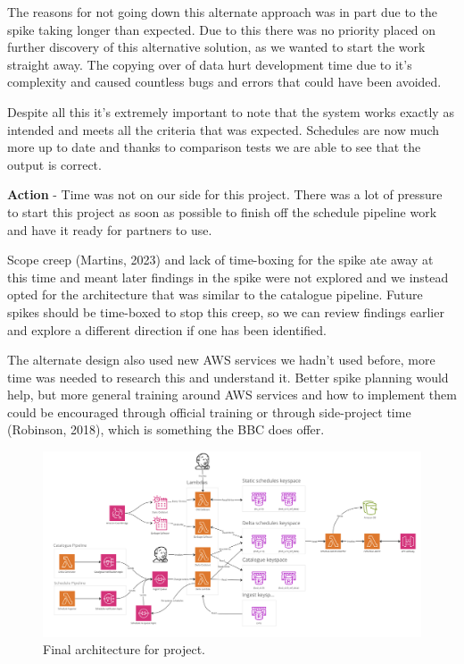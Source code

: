   The reasons for not going down this alternate approach was in part due to the spike taking longer than expected. Due to this there was no priority placed 
  on further discovery of this alternative solution, as we wanted to start the work straight away. The copying over of data hurt development time due to 
  it's complexity and caused countless bugs and errors that could have been avoided.

  Despite all this it's extremely important to note that the system works exactly as intended and meets all the criteria that was expected. Schedules are 
  now much more up to date and thanks to comparison tests we are able to see that the output is correct.

  \vspace{0.2cm}
  \textbf{Action} - Time was not on our side for this project. There was a lot of pressure to start this project as soon as possible to finish off the 
  schedule pipeline work and have it ready for partners to use.

  Scope creep (Martins, 2023) and lack of time-boxing for the spike ate away at this time and meant later findings in the spike were not explored and we 
  instead opted for the architecture that was similar to the catalogue pipeline. Future spikes should be time-boxed to stop this creep, 
  so we can review findings earlier and explore a different direction if one has been identified.

  The alternate design also used new AWS services we hadn't used before, more time was needed to research this and understand it. Better spike planning 
  would help, but more general training around AWS services and how to implement them could be encouraged through official training or through side-project
  time (Robinson, 2018), which is something the BBC does offer.

  \begin{landscape}
    \begin{figure}[H]
      \centering
      \includegraphics[width=20cm]{assets/outputs/finalArchitecture.png}
      \caption{Final architecture for project.}
      \label{fig:finalArchitecture}
    \end{figure}
  \end{landscape}

